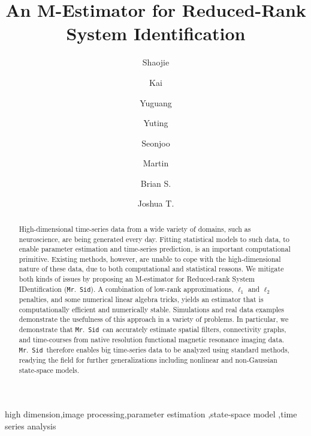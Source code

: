 \documentclass[times,twocolumn,final,authoryear]{elsarticle}
\newcommand{\mrsid}{{\sc \texttt{Mr}.~\texttt{Sid}}}
\begin{document}
\begin{frontmatter}

\title{An M-Estimator for Reduced-Rank System Identification}

\author[a]{Shaojie  }
\author[b]{Kai }
\author[c]{Yuguang }
\author[a]{Yuting }
\author[d]{Seonjoo }
\author[a]{Martin }
\author[a]{Brian S. }
\author[e,f]{Joshua T. }
\address[a]{\small Dept. of Biostatistics, Johns Hopkins Bloomberg School of Public Health, Baltimore 21205, USA}
\address[b]{Dept. of Neuroscience, Johns Hopkins University, Baltimore 21205, USA}
\address[c]{Dept. of Chemical and Biomolecular Engineering, Johns Hopkins University, Baltimore 21205, USA}
\address[d]{Dept. of Psychiatry and Department of Biostatistics, Columbia University, New York City 10027, USA}
\address[e]{Child Mind Institute, Baltimore 21205, USA}
\address[f]{Dept. of Biomedical Engineering and Institute for Computational Medicine, Johns Hopkins University, Baltimore 21205, USA}



\begin{abstract}
High-dimensional time-series data from a wide variety of domains, such as neuroscience, are being generated every day. Fitting statistical models to such data, to enable parameter estimation and time-series prediction, is an important computational primitive. Existing methods, however, are unable to cope with the high-dimensional nature of these data, due to both computational and statistical reasons.  We mitigate both kinds of issues by proposing an M-estimator for Reduced-rank System IDentification (\mrsid). A combination of low-rank approximations, $\ell_1$ and $\ell_2$ penalties, and some numerical linear algebra tricks, yields an estimator that is computationally efficient and numerically stable.  Simulations and real data examples demonstrate the usefulness of this approach in a variety of problems.  In particular, we demonstrate that \mrsid~can accurately estimate spatial filters, connectivity graphs, and time-courses from native resolution functional magnetic resonance imaging data. \mrsid~therefore enables big time-series data to be analyzed using standard methods, readying the field for further generalizations including nonlinear and non-Gaussian state-space models.
\end{abstract}

\begin{keyword}
 high dimension\sep image processing\sep parameter estimation \sep state-space model \sep time series analysis
\end{keyword}

\end{frontmatter}
\end{document}
